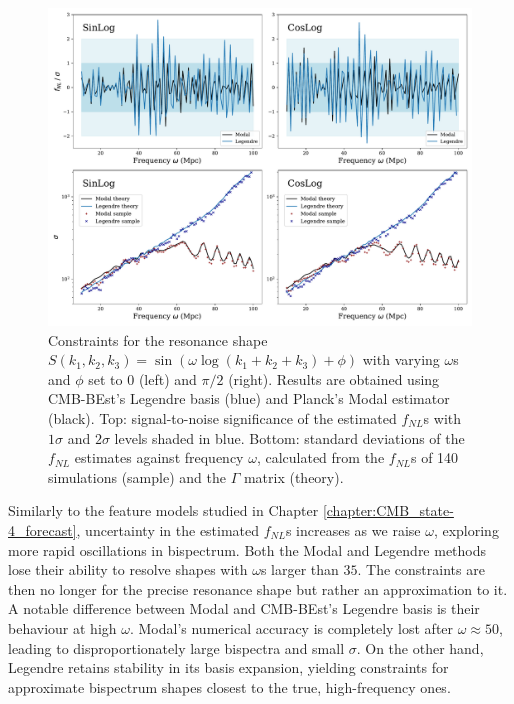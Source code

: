 \begin{figure}[htbp!] 
	\centering    
	\includegraphics[width=\textwidth]{sinlog_template_frequency_Legendre_Modal.pdf}
	\caption{Constraints for the resonance shape $S(k_1,k_2,k_3) = \sin(\omega \log(k_1 + k_2 + k_3 ) + \phi)$ with varying $\omega$s and $\phi$ set to $0$ (left) and $\pi/2$ (right). Results are obtained using CMB-BEst's Legendre basis (blue) and Planck's Modal estimator (black). Top: signal-to-noise significance of the estimated $f_{NL}$s with $1\sigma$ and $2\sigma$ levels shaded in blue. Bottom: standard deviations of the $f_{NL}$ estimates against frequency $\omega$, calculated from the $f_{NL}$s of 140 simulations (sample) and the $\Gamma$ matrix (theory).}
	\label{fig:sinlog_template_frequency_Legendre_Modal}
\end{figure}

Similarly to the feature models studied in Chapter \ref{chapter:CMB_state-4_forecast}, uncertainty in the estimated $f_{NL}$s increases as we raise $\omega$, exploring more rapid oscillations in bispectrum. Both the Modal and Legendre methods lose their ability to resolve shapes with $\omega$s larger than $35$. The constraints are then no longer for the precise resonance shape but rather an approximation to it. A notable difference between Modal and CMB-BEst's Legendre basis is their behaviour at high $\omega$. Modal's numerical accuracy is completely lost after $\omega\approx 50$, leading to disproportionately large bispectra and small $\sigma$. On the other hand, Legendre retains stability in its basis expansion, yielding constraints for approximate bispectrum shapes closest to the true, high-frequency ones.

